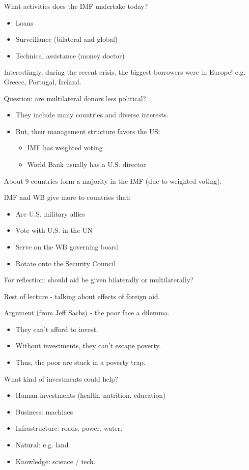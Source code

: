 \documentclass{article}
\begin{document}
What activities does the IMF undertake today?
\begin{itemize}
  \item Loans
  \item Surveillance (bilateral and global)
  \item Technical assistance (money doctor)
\end{itemize}

Interestingly, during the recent crisis, the biggest borrowers were in Europe!  e.g. Greece, Portugal, Ireland.

Question: are multilateral donors less political?
\begin{itemize}
  \item They include many countries and diverse interests.
  \item But, their management structure favors the US:
    \begin{itemize}
      \item IMF has weighted voting
      \item World Bank usually has a U.S. director
    \end{itemize}
\end{itemize}

About 9 countries form a majority in the IMF (due to weighted voting).

IMF and WB give more to countries that:
\begin{itemize}
  \item Are U.S. military allies
  \item Vote with U.S. in the UN
  \item Serve on the WB governing board
  \item Rotate onto the Security Council
\end{itemize}

For reflection: should aid be given bilaterally or multilaterally?

Rest of lecture - talking about effects of foreign aid.

Argument (from Jeff Sachs) - the poor face a dilemma.
\begin{itemize}
  \item They can't afford to invest.
  \item Without investments, they can't escape poverty.
  \item Thus, the poor are stuck in a poverty trap.
\end{itemize}

What kind of investments could help?
\begin{itemize}
  \item Human investments (health, nutrition, education)
  \item Business: machines
  \item Infrastructure: roads, power, water.
  \item Natural: e.g. land
  \item Knowledge: science / tech.
\end{itemize}
\end{document}

